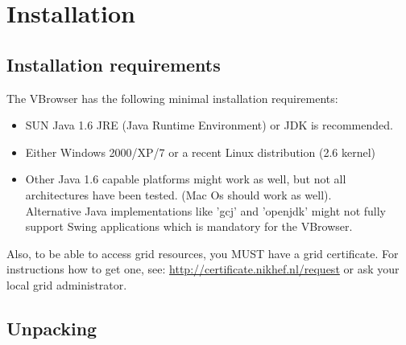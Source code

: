 %
%


\chapter{Installation}
\label{chap:vlet_installation}

\section{Installation requirements}

The VBrowser has the following minimal installation requirements:
\begin{itemize}  
   \item SUN Java 1.6 JRE (Java Runtime Environment) or JDK is recommended.   
   \item Either Windows 2000/XP/7 or a recent Linux distribution (2.6 kernel)
   \item Other Java 1.6 capable platforms might work as well, but not all
   architectures have been tested. (Mac Os should work as well).\\
   Alternative Java implementations like 'gcj'  and 'openjdk' might not fully
   support Swing applications which is mandatory for the VBrowser. 
 \end{itemize} 

Also, to be able to access grid resources, you MUST have a grid certificate. 
For instructions how to get one, see:
\url{http://certificate.nikhef.nl/request} or ask your local grid administrator. 

\section{Unpacking}

